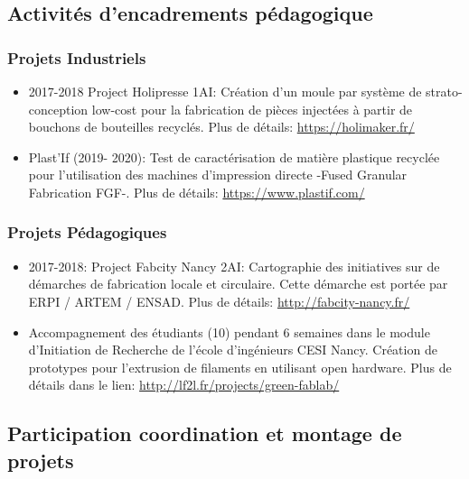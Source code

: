 \documentclass[
  11pt,
]{article}
\begin{document}
\hypertarget{activituxe9s-dencadrements-puxe9dagogique}{%
\subsection{Activités d'encadrements
pédagogique}\label{activituxe9s-dencadrements-puxe9dagogique}}

\hypertarget{projets-industriels}{%
\subsubsection{Projets Industriels}\label{projets-industriels}}

\begin{itemize}
\item
  2017-2018 Project Holipresse 1AI: Création d'un moule par système de
  strato-conception low-cost pour la fabrication de pièces injectées à
  partir de bouchons de bouteilles recyclés. Plus de détails:
  \url{https://holimaker.fr/}
\item
  Plast'If (2019- 2020): Test de caractérisation de matière plastique
  recyclée pour l'utilisation des machines d'impression directe -Fused
  Granular Fabrication FGF-. Plus de détails:
  \url{https://www.plastif.com/}
\end{itemize}

\hypertarget{projets-puxe9dagogiques}{%
\subsubsection{Projets Pédagogiques}\label{projets-puxe9dagogiques}}

\begin{itemize}
\item
  2017-2018: Project Fabcity Nancy 2AI: Cartographie des initiatives sur
  de démarches de fabrication locale et circulaire. Cette démarche est
  portée par ERPI / ARTEM / ENSAD. Plus de détails:
  \url{http://fabcity-nancy.fr/}
\item
  Accompagnement des étudiants (10) pendant 6 semaines dans le module
  d'Initiation de Recherche de l'école d'ingénieurs CESI Nancy. Création
  de prototypes pour l'extrusion de filaments en utilisant open
  hardware. Plus de détails dans le lien:
  \url{http://lf2l.fr/projects/green-fablab/}
\end{itemize}

\hypertarget{participation-coordination-et-montage-de-projets}{%
\subsection{Participation coordination et montage de
projets}\label{participation-coordination-et-montage-de-projets}}
\end{document}
